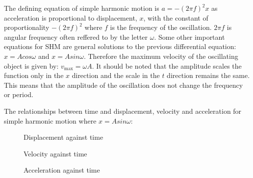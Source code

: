 \documentclass[a4,8pt]{article}
\begin{document}
The defining equation of simple harmonic motion is $a=-(2\pi f)^2 x$ as acceleration is proportional to displacement, $x$, with the constant of proportionality $-(2\pi f)^2$ where $f$ is the frequency of the oscillation. $2\pi f$ is angular frequency often reffered to by the letter $\omega$. Some other important equations for SHM are general solutions to the previous differential equation: $x=Acos\omega$ and $x=Asin\omega$. Therefore the maximum velocity of the oscillating object is given by: $v_\text{max}=\omega A$. It should be noted that the amplitude scales the function only in the $x$ direction and the scale in the $t$ direction remains the same. This means that the amplitude of the oscillation does not change the frequency or period.
\vspace{8pt}

The relationships between time and displacement, velocity and acceleration for simple harmonic motion where $x=Asin\omega$:
\begin{figure}[h]
\begin{center}
\end{center}
\caption{Displacement against time}
\end{figure}

\begin{figure}[h]
\begin{center}
\end{center}
\caption{Velocity against time}
\end{figure}

\begin{figure}[h]
\begin{center}
\end{center}
\caption{Acceleration against time}
\end{figure}
\end{document}
